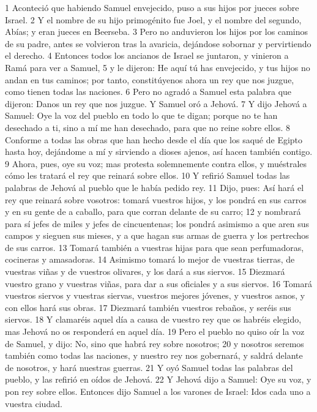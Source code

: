 1 Aconteció que habiendo Samuel envejecido, puso a sus hijos por jueces sobre Israel.
2 Y el nombre de su hijo primogénito fue Joel, y el nombre del segundo, Abías; y eran jueces en Beerseba.
3 Pero no anduvieron los hijos por los caminos de su padre, antes se volvieron tras la avaricia, dejándose sobornar y pervirtiendo el derecho.
4 Entonces todos los ancianos de Israel se juntaron, y vinieron a Ramá para ver a Samuel,
5 y le dijeron: He aquí tú has envejecido, y tus hijos no andan en tus caminos; por tanto, constitúyenos ahora un rey que nos juzgue, como tienen todas las naciones. 
6 Pero no agradó a Samuel esta palabra que dijeron: Danos un rey que nos juzgue. Y Samuel oró a Jehová.
7 Y dijo Jehová a Samuel: Oye la voz del pueblo en todo lo que te digan; porque no te han desechado a ti, sino a mí me han desechado, para que no reine sobre ellos.
8 Conforme a todas las obras que han hecho desde el día que los saqué de Egipto hasta hoy, dejándome a mí y sirviendo a dioses ajenos, así hacen también contigo.
9 Ahora, pues, oye su voz; mas protesta solemnemente contra ellos, y muéstrales cómo les tratará el rey que reinará sobre ellos.
10 Y refirió Samuel todas las palabras de Jehová al pueblo que le había pedido rey.
11 Dijo, pues: Así hará el rey que reinará sobre vosotros: tomará vuestros hijos, y los pondrá en sus carros y en su gente de a caballo, para que corran delante de su carro;
12 y nombrará para sí jefes de miles y jefes de cincuentenas; los pondrá asimismo a que aren sus campos y sieguen sus mieses, y a que hagan sus armas de guerra y los pertrechos de sus carros.
13 Tomará también a vuestras hijas para que sean perfumadoras, cocineras y amasadoras.
14 Asimismo tomará lo mejor de vuestras tierras, de vuestras viñas y de vuestros olivares, y los dará a sus siervos.
15 Diezmará vuestro grano y vuestras viñas, para dar a sus oficiales y a sus siervos.
16 Tomará vuestros siervos y vuestras siervas, vuestros mejores jóvenes, y vuestros asnos, y con ellos hará sus obras.
17 Diezmará también vuestros rebaños, y seréis sus siervos.
18 Y clamaréis aquel día a causa de vuestro rey que os habréis elegido, mas Jehová no os responderá en aquel día.
19 Pero el pueblo no quiso oír la voz de Samuel, y dijo: No, sino que habrá rey sobre nosotros;
20 y nosotros seremos también como todas las naciones, y nuestro rey nos gobernará, y saldrá delante de nosotros, y hará nuestras guerras.
21 Y oyó Samuel todas las palabras del pueblo, y las refirió en oídos de Jehová.
22 Y Jehová dijo a Samuel: Oye su voz, y pon rey sobre ellos. Entonces dijo Samuel a los varones de Israel: Idos cada uno a vuestra ciudad.

